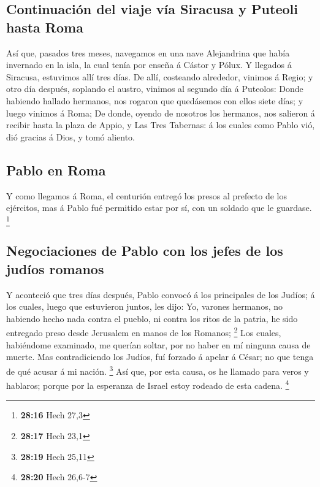 \hypertarget{continuaciuxf3n-del-viaje-vuxeda-siracusa-y-puteoli-hasta-roma}{%
\subsection{Continuación del viaje vía Siracusa y Puteoli hasta
Roma}\label{continuaciuxf3n-del-viaje-vuxeda-siracusa-y-puteoli-hasta-roma}}

 Así que, pasados tres meses, navegamos en una nave
Alejandrina que había invernado en la isla, la cual tenía por enseña á
Cástor y Pólux.  Y llegados á Siracusa, estuvimos allí tres
días.  De allí, costeando alrededor, vinimos á Regio; y
otro día después, soplando el austro, vinimos al segundo día á Puteolos:
 Donde habiendo hallado hermanos, nos rogaron que
quedásemos con ellos siete días; y luego vinimos á Roma; 
De donde, oyendo de nosotros los hermanos, nos salieron á recibir hasta
la plaza de Appio, y Las Tres Tabernas: á los cuales como Pablo vió, dió
gracias á Dios, y tomó aliento.

\hypertarget{pablo-en-roma}{%
\subsection{Pablo en Roma}\label{pablo-en-roma}}

 Y como llegamos á Roma, el centurión entregó los presos al
prefecto de los ejércitos, mas á Pablo fué permitido estar por sí, con
un soldado que le guardase. \footnote{\textbf{28:16} Hech 27,3}

\hypertarget{negociaciones-de-pablo-con-los-jefes-de-los-juduxedos-romanos}{%
\subsection{Negociaciones de Pablo con los jefes de los judíos
romanos}\label{negociaciones-de-pablo-con-los-jefes-de-los-juduxedos-romanos}}

 Y aconteció que tres días después, Pablo convocó á los
principales de los Judíos; á los cuales, luego que estuvieron juntos,
les dijo: Yo, varones hermanos, no habiendo hecho nada contra el pueblo,
ni contra los ritos de la patria, he sido entregado preso desde
Jerusalem en manos de los Romanos; \footnote{\textbf{28:17} Hech 23,1}
 Los cuales, habiéndome examinado, me querían soltar, por
no haber en mí ninguna causa de muerte.  Mas contradiciendo
los Judíos, fuí forzado á apelar á César; no que tenga de qué acusar á
mi nación. \footnote{\textbf{28:19} Hech 25,11}  Así que,
por esta causa, os he llamado para veros y hablaros; porque por la
esperanza de Israel estoy rodeado de esta cadena. \footnote{\textbf{28:20}
  Hech 26,6-7}

